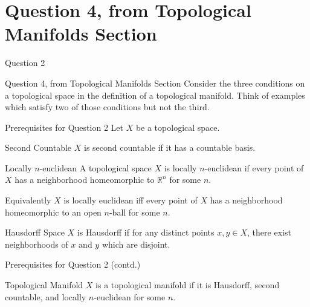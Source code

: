 \documentclass{beamer}
\begin{document}
\section{Question 4, from Topological Manifolds Section}
\begin{frame}{Question 2}
\begin{block}{Question 4, from Topological Manifolds Section}
Consider the three conditions on a topological space in the definition of a topological manifold. Think of examples which satisfy two of those conditions
but not the third.
\end{block}
\end{frame}

\begin{frame}{Prerequisites for Question 2}
Let $X$ be a topological space.
\begin{block}{Second Countable}
$\displaystyle X$ is \alert{second countable} if it has a countable basis. 
\end{block}
\begin{block}{Locally $n$-euclidean}
A topological space $\displaystyle X$ is \alert{locally $n$-euclidean} if every point of $\displaystyle X$ has a neighborhood homeomorphic to $\displaystyle \mathbb{R}^{n}$ for some $\displaystyle n$.


Equivalently $\displaystyle X$ is locally
euclidean iff every point of $\displaystyle X$ has a neighborhood homeomorphic to an open $\displaystyle n$-ball for some $\displaystyle n$.


\end{block}
\begin{block}{Hausdorff Space}
$\displaystyle X$ is \alert{Hausdorff} if for any distinct points $\displaystyle x,y\in X$, there exist neighborhoods of $\displaystyle x$ and $\displaystyle y$ which are disjoint.
\end{block}
\end{frame}
\begin{frame}{Prerequisites for Question 2 (contd.)}
\begin{block}{Topological Manifold}
$\displaystyle X$ is a topological manifold if it is Hausdorff, second countable, and locally $\displaystyle n$-euclidean for some $\displaystyle n$.
\end{block}
\end{frame}
\end{document}

